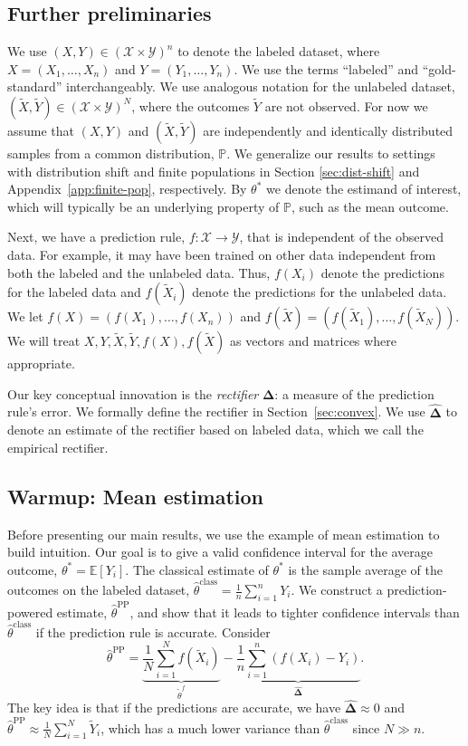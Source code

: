 \documentclass[10pt]{article}
\def\E{\mathbb{E}}
\newcommand{\Y}{\mathcal{Y}}
\newcommand{\X}{\mathcal{X}}
\renewcommand{\P}{\mathbb{P}}
\newcommand{\tX}{\widetilde{X}}
\newcommand{\Xt}{\widetilde{X}}
\newcommand{\Yt}{\widetilde{Y}}
\newcommand{\thetaclass}{\hat{\theta}^{\mathrm{class}}}
\newcommand{\thetaf}{\tilde{\theta}^{f}}
\newcommand{\thetaPP}{\hat{\theta}^{\mathrm{PP}}}
\newcommand{\rec}{\mathbf{\Delta}}
\newcommand{\rechat}{\hat{\mathbf{\Delta}}}
\begin{document}
\subsection{Further preliminaries}

We use $(X,Y)\in (\X\times \Y)^n$ to denote the labeled dataset, where $X = (X_1,\dots,X_n)$ and $Y = (Y_1,\dots,Y_n)$. We use the terms ``labeled'' and ``gold-standard'' interchangeably.
We use analogous notation for the unlabeled dataset, $(\Xt,\Yt)\in (\X\times\Y)^N$, where the outcomes $\Yt$ are not observed.
For now we assume that $(X,Y)$ and $(\Xt,\Yt)$ are independently and identically distributed samples from a common distribution, $\P$. We generalize our results to settings with distribution shift and finite populations in Section \ref{sec:dist-shift} and Appendix~\ref{app:finite-pop}, respectively.
By $\theta^*$ we denote the estimand of interest, which will typically be an underlying property of $\P$, such as the mean outcome.

Next, we have a prediction rule, $f: \mathcal{X} \rightarrow \mathcal{Y}$, that is independent of the observed data. For example, it may have been trained on other data independent from both the labeled and the unlabeled data.
Thus, $f(X_i)$ denote the predictions for the labeled data and $f(\Xt_i)$ denote the predictions for the unlabeled data.
We let $f(X) = (f(X_1),\dots,f(X_n))$ and $f(\Xt) = (f(\Xt_1),\dots,f(\Xt_N))$.
We will treat $X,Y,\Xt,\Yt,f(X),f(\tX)$ as vectors and matrices where appropriate.

Our key conceptual innovation is the \emph{rectifier} $\rec$: a measure of the prediction rule's error. We formally define the rectifier in Section~\ref{sec:convex}. We use $\rechat$ to denote an estimate of the rectifier based on labeled data, which we call the empirical rectifier.

\subsection{Warmup: Mean estimation}
\label{subsec:warmup}

Before presenting our main results, we use the example of mean estimation to build intuition.
Our goal is to give a valid confidence interval for the average outcome, $\theta^* = \E[Y_i]$.  
The classical estimate of $\theta^*$ is the sample average of the outcomes on the labeled dataset, $\thetaclass = \frac{1}{n} \sum_{i=1}^n Y_i$.
We construct a prediction-powered estimate, $\thetaPP$, and show that it leads to tighter confidence intervals than $\thetaclass$ if the prediction rule is accurate.
Consider
\begin{equation}
\label{eq:PP_estimator_means}
\thetaPP = \underbrace{\frac{1}{N} \sum_{i=1}^N f(\Xt_i)}_{\thetaf} - \underbrace{\frac{1}{n} \sum_{i=1}^n (f(X_i) - Y_i)}_{\rechat}.
\end{equation}
The key idea is that if the predictions are accurate, we have $\rechat \approx 0$ and $\thetaPP \approx \frac{1}{N}\sum_{i=1}^N \Yt_i$, which has a much lower variance than $\thetaclass$ since $N\gg n$. 
\end{document}
